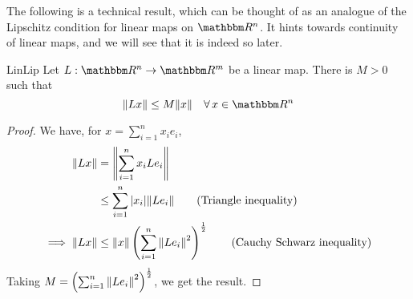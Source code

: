 \documentclass[../Analysis-3]{subfiles}
\begin{document}
The following is a technical result, which can be thought of as an analogue of the Lipschitz condition for linear maps on $ \R^n $. It hints towards continuity of linear maps, and we will see that it is indeed so later.
\ssk

\begin{Thm}{}{LinLip}
      Let $ L: \R^n \to \R^m $ be a linear map. There is $ M > 0 $ such that
      \[ \norm{Lx} \leq M \norm{x} \quad \forall \, x \in \R^n \]
\end{Thm}
\begin{proof}
      We have, for $ x = \sum_{i=1}^{n}x_ie_i $,
      \begin{align*}
            \norm{Lx}          & = \norm{\sum_{i=1}^{n} x_i Le_i}                                                                  \\
                               & \leq \sum_{i=1}^{n} |x_i| \norm{Le_i} \tag{Triangle inequality}                                   \\
            \implies \norm{Lx} & \leq \norm{x} \left(\sum_{i=1}^{n}\norm{Le_i}^2\right)^{\frac 12} \tag{Cauchy Schwarz inequality}
      \end{align*}
      Taking $ M = \left(\sum_{i=1}^{n}\norm{Le_i}^2\right)^{\frac 12} $, we get the result.
\end{proof}
\end{document}
